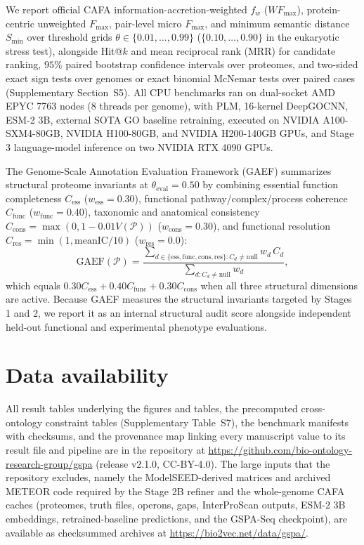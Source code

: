\documentclass[10pt,twocolumn]{article}
\begin{document}
We report official CAFA information-accretion-weighted $f_w$ ($WF_{\max}$), protein-centric unweighted $F_{\max}$, pair-level micro $F_{\max}$, and minimum semantic distance $S_{\min}$ \citep{radivojac2013large,jiang2016expanded,clark2013information} over threshold grids $\theta \in \{0.01, \dots, 0.99\}$ ($\{0.10, \dots, 0.90\}$ in the eukaryotic stress test), alongside Hit@$k$ and mean reciprocal rank (MRR) for candidate ranking, $95\%$ paired bootstrap confidence intervals over proteomes, and two-sided exact sign tests over genomes or exact binomial McNemar tests over paired cases (Supplementary Section~S5). All CPU benchmarks ran on dual-socket AMD EPYC 7763 nodes (8 threads per genome), with PLM, 16-kernel DeepGOCNN, ESM-2 3B, external SOTA GO baseline retraining, executed on NVIDIA A100-SXM4-80GB, NVIDIA H100-80GB, and NVIDIA H200-140GB GPUs, and Stage 3 language-model inference on two NVIDIA RTX 4090 GPUs.

The Genome-Scale Annotation Evaluation Framework (GAEF) summarizes structural proteome invariants at $\theta_{\text{eval}} = 0.50$ by combining essential function completeness $C_{\text{ess}}$ ($w_{\text{ess}} = 0.30$), functional pathway/complex/process coherence $C_{\text{func}}$ ($w_{\text{func}} = 0.40$), taxonomic and anatomical consistency $C_{\text{cons}} = \max(0, 1 - 0.01 V(\mathcal{P}))$ ($w_{\text{cons}} = 0.30$), and functional resolution $C_{\text{res}} = \min(1, \text{meanIC}/10)$ ($w_{\text{res}} = 0.0$):
\begin{equation}
  \text{GAEF}(\mathcal{P}) = \frac{\sum_{d \in \{\text{ess}, \text{func}, \text{cons}, \text{res}\} : C_d \ne \text{null}} w_d \, C_d}{\sum_{d : C_d \ne \text{null}} w_d},
  \label{eq:gaef}
\end{equation}
which equals $0.30 C_{\text{ess}} + 0.40 C_{\text{func}} + 0.30 C_{\text{cons}}$ when all three structural dimensions are active. Because GAEF measures the structural invariants targeted by Stages 1 and 2, we report it as an internal structural audit score alongside independent held-out functional and experimental phenotype evaluations.

\section*{Data availability}

All result tables underlying the figures and tables, the precomputed cross-ontology constraint tables (Supplementary Table~S7), the benchmark manifests with checksums, and the provenance map linking every manuscript value to its result file and pipeline are in the repository at \url{https://github.com/bio-ontology-research-group/gspa} (release v2.1.0, CC-BY-4.0). The large inputs that the repository excludes, namely the ModelSEED-derived matrices and archived METEOR code required by the Stage 2B refiner and the whole-genome CAFA caches (proteomes, truth files, operons, gaps, InterProScan outputs, ESM-2 3B embeddings, retrained-baseline predictions, and the GSPA-Seq checkpoint), are available as checksummed archives at \url{https://bio2vec.net/data/gspa/}.
\end{document}
